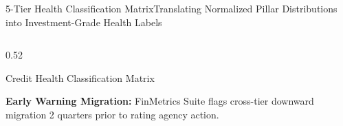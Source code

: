 \begin{frame}{5-Tier Health Classification Matrix}{Translating Normalized Pillar Distributions into Investment-Grade Health Labels}
\begin{columns}[T,onlytextwidth]
\begin{column}{0.52\textwidth}
\begin{quantcard}[height=5.60cm]{Credit Health Classification Matrix}
                \vspace{3pt}
                {\raggedright\textbf{\color{deepemerald}Early Warning Migration:}
                FinMetrics Suite flags cross-tier downward migration 2 quarters prior to rating agency action.\par}
                \vspace{3pt}
            \end{quantcard}
        \end{column}
    \end{columns}
\end{frame}
